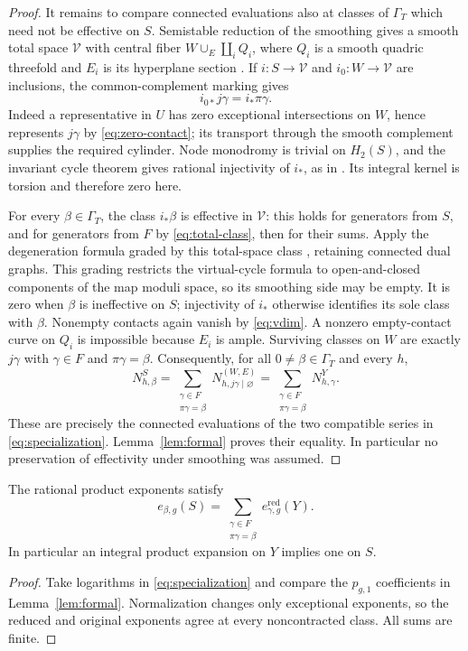 \begin{proof}
It remains to compare connected evaluations also at classes of
$\Gamma_T$ which need not be effective on $S$. Semistable reduction
of the smoothing gives a smooth total space $\mathscr V$ with central
fiber $W\cup_E\coprod_i Q_i$, where $Q_i$ is a smooth quadric
threefold and $E_i$ is its hyperplane section
\cite[Section 3.1]{LW}. If $i:S\to\mathscr V$ and
$i_0:W\to\mathscr V$ are inclusions, the common-complement marking
gives
\begin{equation}\label{eq:total-class}
 i_{0*}j\gamma=i_*\pi\gamma.
\end{equation}
Indeed a representative in $U$ has zero exceptional intersections on
$W$, hence represents $j\gamma$ by \eqref{eq:zero-contact}; its
transport through the smooth complement supplies the required
cylinder. Node monodromy is trivial on $H_2(S)$, and the invariant
cycle theorem gives rational injectivity of $i_*$, as in
\cite[Lemmas 2.18 and 3.4]{LW}. Its integral kernel is torsion and
therefore zero here.

For every $\beta\in\Gamma_T$, the class $i_*\beta$ is effective in
$\mathscr V$: this holds for generators from $S$, and for generators
from $F$ by \eqref{eq:total-class}, then for their sums. Apply the
degeneration formula graded by this total-space class
\cite[Theorem 2.16]{LW}, retaining connected dual graphs.
This grading restricts the virtual-cycle formula to open-and-closed
components of the map moduli space, so its smoothing side may be
empty. It is zero when $\beta$ is ineffective on $S$; injectivity of
$i_*$ otherwise identifies its sole class with $\beta$.
Nonempty contacts again vanish by \eqref{eq:vdim}. A nonzero
empty-contact curve on $Q_i$ is impossible because $E_i$ is ample.
Surviving classes on $W$ are exactly $j\gamma$ with
$\gamma\in F$ and $\pi\gamma=\beta$. Consequently, for all
$0\ne\beta\in\Gamma_T$ and every $h$,
\[
 N^S_{h,\beta}=\sum_{\substack{\gamma\in F\\\pi\gamma=\beta}}
 N^{(W,E)}_{h,j\gamma\mid\varnothing}
 =\sum_{\substack{\gamma\in F\\\pi\gamma=\beta}}N^Y_{h,\gamma}.
\]
These are precisely the connected evaluations of the two compatible
series in \eqref{eq:specialization}. Lemma~\ref{lem:formal} proves
their equality. In particular no preservation of effectivity under
smoothing was assumed.
\end{proof}

\begin{corollary}\label{cor:integral}
The rational product exponents satisfy
\[
 e_{\beta,g}(S)=\sum_{\substack{\gamma\in F\\\pi\gamma=\beta}}
 e^{\mathrm{red}}_{\gamma,g}(Y).
\]
In particular an integral product expansion on $Y$ implies one on $S$.
\end{corollary}
\begin{proof}
Take logarithms in \eqref{eq:specialization} and compare the
$p_{g,1}$ coefficients in Lemma~\ref{lem:formal}. Normalization
changes only exceptional exponents, so the reduced and original
exponents agree at every noncontracted class. All sums are finite.
\end{proof}

